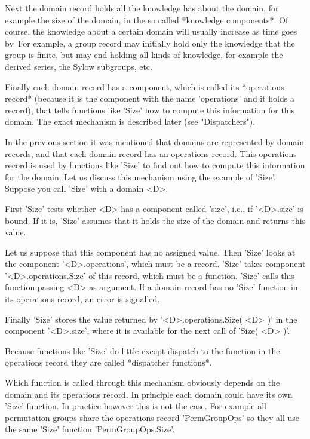 Next the  domain record  holds all   the knowledge  {\GAP} has  about the
domain, for example the  size of the domain, in  the so called *knowledge
components*.   Of  course, the  knowledge   about a certain  domain  will
usually  increase  as time goes  by.   For example,  a  group  record may
initially hold  only the knowledge that the  group is finite, but may end
holding all kinds of knowledge, for example the derived series, the Sylow
subgroups, etc.

Finally  each   domain  record has    a component,  which  is called  its
*operations   record*  (because  it   is   the component  with  the  name
'operations' and it holds a record), that tells functions like 'Size' how
to  compute this  information  for this domain.   The exact  mechanism is
described later (see "Dispatchers").

%
%

In the previous section it was  mentioned that domains are represented by
domain records, and  that each domain record  has  an operations  record.
This operations record  is used by functions like 'Size' to  find out how
to  compute  this information  for  the  domain.   Let  us  discuss  this
mechanism using the example  of 'Size'.  Suppose you  call 'Size'  with a
domain <D>.

First 'Size' tests whether  <D> has a  component called 'size',  i.e., if
'<D>.size' is bound.  If it is, 'Size' assumes that  it holds the size of
the domain and returns this value.

Let  us suppose that this component has no assigned  value.  Then  'Size'
looks at the component '<D>.operations', which must be a  record.  'Size'
takes  component '<D>.operations.Size' of this  record,  which must  be a
function.  'Size'  calls this  function  passing <D>  as argument.  If  a
domain  record has no 'Size' function in its operations record,  an error
is signalled.

Finally 'Size' stores the value returned  by '<D>.operations.Size( <D> )'
in the  component '<D>.size', where it is  available for the next call of
'Size( <D> )'.

Because functions like  'Size' do little  except dispatch to the function
in the operations record they are called *dispatcher functions*.

Which function is called through  this mechanism obviously depends on the
domain and its  operations record.  In  principle each  domain could have
its own 'Size' function.  In practice however this is  not the case.  For
example all permutation groups share the operations record 'PermGroupOps'
so they all use the same 'Size' function 'PermGroupOps.Size'.

